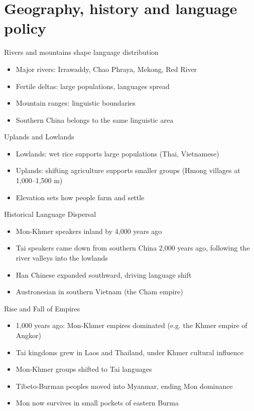 \documentclass{beamer}
\begin{document}
\section{Geography, history and language policy}

\begin{frame}{Rivers and mountains shape language distribution}
    \begin{itemize}
        \item Major rivers: Irrawaddy, Chao Phraya, Mekong, Red River
        \item Fertile deltas: large populations, languages spread
        \item Mountain ranges: linguistic boundaries
        \item Southern China belongs to the same linguistic area
    \end{itemize}
\end{frame}

\begin{frame}{Uplands and Lowlands}
    \begin{itemize}
        \item Lowlands: wet rice supports large populations (Thai, Vietnamese)
        \item Uplands: shifting agriculture supports smaller groups
          (Hmong villages at 1,000–1,500 m)
        \item Elevation sets how people farm and settle
    \end{itemize}
\end{frame}

\begin{frame}{Historical Language Dispersal}
    \begin{itemize}
        \item Mon-Khmer speakers inland by 4,000 years ago
        \item Tai speakers came down from southern China 2,000 years ago,
          following the river valleys into the lowlands
        \item Han Chinese expanded southward, driving language shift
        \item Austronesian in southern Vietnam (the Cham empire)
    \end{itemize}
\end{frame}

\begin{frame}{Rise and Fall of Empires}
    \begin{itemize}
    \item 1,000 years ago: Mon-Khmer empires dominated
      (e.g. the Khmer empire of Angkor)
    \item Tai kingdoms grew in Laos and Thailand, under Khmer cultural influence
    \item Mon-Khmer groups shifted to Tai languages
    \item Tibeto-Burman peoples moved into Myanmar, ending Mon dominance
    \item Mon now survives in small pockets of eastern Burma
    \end{itemize}
  \end{frame}
\end{document}
